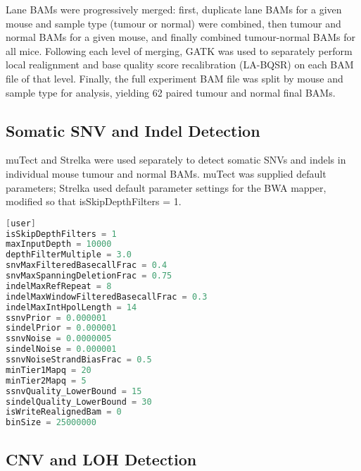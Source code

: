\documentclass[thesis.tex]{subfiles}
\begin{document}
Lane BAMs were progressively merged: first, duplicate lane BAMs for a given mouse and sample type (tumour or normal) were combined, then tumour and normal BAMs for a given mouse, and finally combined tumour-normal BAMs for all mice.  Following each level of merging, GATK was used to separately perform local realignment and base quality score recalibration (LA-BQSR) on each BAM file of that level.  Finally, the full experiment BAM file was split by mouse and sample type for analysis, yielding 62 paired tumour and normal final BAMs.

\subsection{Somatic SNV and Indel Detection}

muTect and Strelka were used separately to detect somatic SNVs and indels in individual mouse tumour and normal BAMs.  muTect was supplied default parameters; Strelka used default parameter settings for the BWA mapper, modified so that isSkipDepthFilters = 1.  

\begin{lstlisting}[language=C]
[user]
isSkipDepthFilters = 1
maxInputDepth = 10000
depthFilterMultiple = 3.0
snvMaxFilteredBasecallFrac = 0.4
snvMaxSpanningDeletionFrac = 0.75
indelMaxRefRepeat = 8
indelMaxWindowFilteredBasecallFrac = 0.3
indelMaxIntHpolLength = 14
ssnvPrior = 0.000001
sindelPrior = 0.000001
ssnvNoise = 0.0000005
sindelNoise = 0.000001
ssnvNoiseStrandBiasFrac = 0.5
minTier1Mapq = 20
minTier2Mapq = 5
ssnvQuality_LowerBound = 15
sindelQuality_LowerBound = 30
isWriteRealignedBam = 0
binSize = 25000000
\end{lstlisting}


\subsection{CNV and LOH Detection}
\end{document}
